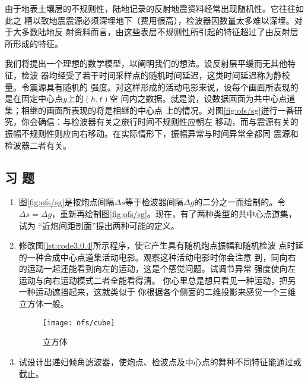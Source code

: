 由于地表土壤层的不规则性，陆地记录的反射地震资料经常出现随机性。它往往如此之
糟以致地震震源必须深埋地下（费用很高），检波器因数量太多难以深埋。对于大多数陆地反
射资料而言，由这些表层不规则性所引起的特征超过了由反射层所形成的特征。

我们将提出一个理想的数学模型，以阐明我们的想法。设反射层平缓而无其他特征，检波
器均经受了若干时间采样点的随机时间延迟，这类时间延迟称为静校量。令震源具有随机的
强度。对这样形成的活动电影来说，设每个画面所表现的是在固定中心点$y$上的$(h,t)$空
间内之数据。就是说，设数据画面为共中心点道集；相继的画面所表现的将是相继的中心点
上的情况。对图\ref{fig:ofs/sg}迸行一番研究，你会确信：与检波器有关之旅行时间不规则性应朝左
移动，而与震源有关的振幅不规则性则应向右移动。在实际情形下，振幅异常与时间异常全都同
震源和检波器二者有关。

\subsection{习 题}
\label{sec:3.0.5}

\begin{enumerate}
\item 图\ref{fig:ofs/sg}是按炮点间隔$\Delta s$等于检波器间隔$\Delta g$的二分之一而绘制的。令
$\Delta s = \Delta g$，重新再绘制图\ref{fig:ofs/sg}。现在，有了两种类型的共中心点道集，试为
“近炮间距剖面”提出两种可能的定义。

\item 修改图\ref{lst:code3.0.4}所示程序，使它产生具有随机炮点振幅和随机检波
点时延的一种合成中心点道集活动电影。观察这种活动电影时你会注意
到，同向右的运动一起还能看到向左的运动，这是个感觉问题。试调节异常
强度使向左运动与向右运动模式二者全能看得清。
你心里总是想只看见一种运动，把另一种运动遮挡起来，这就类似于
你根据各个侧面的二维投影来感觉一个三维立方体一般。
\begin{figure}[H]
\centering
\texttt{[image: ofs/cube]}
\caption[cube]{立方体}
\label{fig:ofs/cube}
\end{figure}

\item 试设计出递妇倾角滤波器，使炮点、检波点及中心点的舞种不同特征能通过或截止。
\end{enumerate}

